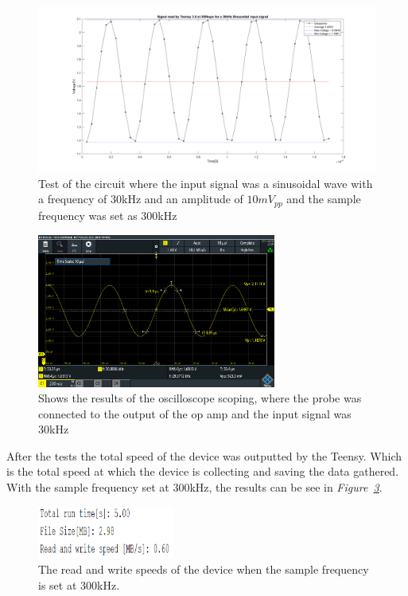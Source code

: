 \begin{figure}[h]
    \centering
    \includegraphics[width=1.0\textwidth]{graphics/30kin_300ksampl.png}
    \caption{Test of the circuit where the input signal was a sinusoidal wave with a frequency of 30kHz and an amplitude of $10mV_{pp}$ and the sample frequency was set as 300kHz}
    \label{fig:Teensy30k300k}
\end{figure}

\begin{figure}[h]
    \centering
    \includegraphics[width=0.7\textwidth]{graphics/30k10mvPP300ksamp.PNG}
    \caption{Shows the results of the oscilloscope scoping, where the probe was connected to the output of the op amp and the input signal was 30kHz}
    \label{fig:Oscillo30k300k}
\end{figure}

\vspace{4cm}

After the tests the total speed of the device was outputted by the Teensy.
Which is the total speed at which the device is collecting and saving the data gathered.
With the sample frequency set at 300kHz, the results can be see in \textit{Figure~\ref{fig:SpeedPDBCont}}.


\begin{figure}[h]
    \centering
    \includegraphics[width=0.4\textwidth]{graphics/Speed300khzFortest16bit20to100khz.png}
    \caption{The read and write speeds of the device when the sample frequency is set at 300kHz.}
    \label{fig:SpeedPDBCont}
\end{figure}

